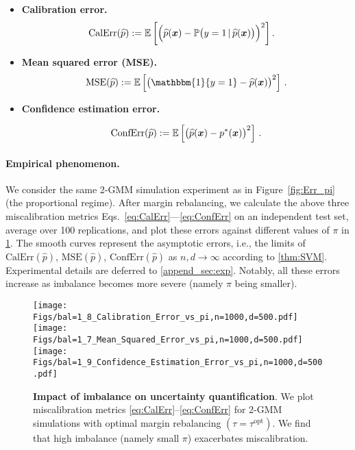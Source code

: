 \begin{itemize}
    \item \textbf{Calibration error.}
    \begin{equation}\label{eq:CalErr}
    \begin{aligned}
        \mathrm{CalErr}(\widehat p) & :=    \mathbb{E}\left[ \Bigl(  
        \widehat p(\text{\boldmath $x$}) - \mathbb{P} \bigl( y = 1 \,|\,  \widehat p(\text{\boldmath $x$}) \bigr)
        \Bigr)^2 \right].
    \end{aligned}
    \end{equation}

    \item \textbf{Mean squared error (MSE).}
    \begin{equation}\label{eq:MSE}
        \mathrm{MSE}(\hat p)  := \E\left[ \bigl( \mathbbm{1}\{ y = 1 \} - \hat p(\xx) \bigr)^2 \right]\,.
    \end{equation}
    \item \textbf{Confidence estimation error.}

    \begin{equation}\label{eq:ConfErr}
        \mathrm{ConfErr}(\widehat p) :=  \mathbb{E}\left[ \bigl( \widehat p(\text{\boldmath $x$}) - p^*(\text{\boldmath $x$}) \bigr)^2 \right]\,.
    \end{equation}
\end{itemize}





\paragraph{Empirical phenomenon.}


We consider the same 2-GMM simulation experiment as in Figure~\ref{fig:Err_pi} (the proportional regime).  After margin rebalancing, we calculate the above three miscalibration metrics Eqs.~\eqref{eq:CalErr}---\eqref{eq:ConfErr} on an independent test set, average over 100 replications, and plot these errors against different values of $\pi$ in \cref{fig:Calibration}. The smooth curves represent the asymptotic errors, i.e., the limits of $\mathrm{CalErr}(\hat p)$, $\mathrm{MSE}(\hat p)$, $\mathrm{ConfErr}(\hat p)$ as $n, d \to \infty$ according to \cref{thm:SVM}. Experimental details are deferred to \cref{append_sec:exp}. Notably, all these errors increase as imbalance becomes more severe (namely $\pi$ being smaller).


\begin{figure}[t]
    \centering
    \texttt{[image: Figs/bal=1\_8\_Calibration\_Error\_vs\_pi,n=1000,d=500.pdf]}
    \texttt{[image: Figs/bal=1\_7\_Mean\_Squared\_Error\_vs\_pi,n=1000,d=500.pdf]}
    \texttt{[image: Figs/bal=1\_9\_Confidence\_Estimation\_Error\_vs\_pi,n=1000,d=500.pdf]}
    \caption{
    \textbf{Impact of imbalance on uncertainty quantification}. We plot miscalibration metrics \cref{eq:CalErr}--\eqref{eq:ConfErr} for 2-GMM simulations with optimal margin rebalancing $(\tau = \tau^\mathrm{opt}).$ We find that high imbalance (namely small $\pi$) exacerbates miscalibration.
    }
    \label{fig:Calibration}
\end{figure}


